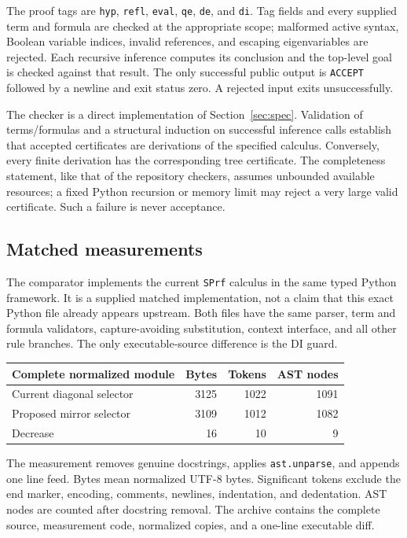 \documentclass[11pt]{article}
\theoremstyle{definition}\newtheorem{definition}[theorem]{Definition}
\begin{document}
The proof tags are \texttt{hyp}, \texttt{refl}, \texttt{eval},
\texttt{qe}, \texttt{de}, and \texttt{di}. Tag fields and every supplied
term and formula are checked at the appropriate scope; malformed active
syntax, Boolean variable indices, invalid references, and escaping
eigenvariables are rejected. Each recursive inference computes its
conclusion and the top-level goal is checked against that result.
The only successful public output is \texttt{ACCEPT} followed by a
newline and exit status zero. A rejected input exits unsuccessfully.

The checker is a direct implementation of Section~\ref{sec:spec}.
Validation of terms/formulas and a structural induction on successful
inference calls establish that accepted certificates are derivations of
the specified calculus. Conversely, every finite derivation has the
corresponding tree certificate. The completeness statement, like that
of the repository checkers, assumes unbounded available resources;
a fixed Python recursion or memory limit may reject a very large valid
certificate. Such a failure is never acceptance.

\subsection{Matched measurements}
The comparator implements the current \texttt{SPrf} calculus in the
same typed Python framework. It is a supplied matched implementation,
not a claim that this exact Python file already appears upstream.
Both files have the same parser, term and formula validators,
capture-avoiding substitution, context interface, and all other rule
branches. The only executable-source difference is the DI guard.

\begin{center}
\begin{tabular}{lrrr}
\toprule
Complete normalized module & Bytes & Tokens & AST nodes\\
\midrule
Current diagonal selector & 3125 & 1022 & 1091\\
Proposed mirror selector  & 3109 & 1012 & 1082\\
Decrease                 &   16 &   10 &    9\\
\bottomrule
\end{tabular}
\end{center}

The measurement removes genuine docstrings, applies \texttt{ast.unparse},
and appends one line feed. Bytes mean normalized UTF-8 bytes. Significant
tokens exclude the end marker, encoding, comments, newlines, indentation,
and dedentation. AST nodes are counted after docstring removal. The
archive contains the complete source, measurement code, normalized
copies, and a one-line executable diff.
\end{document}
